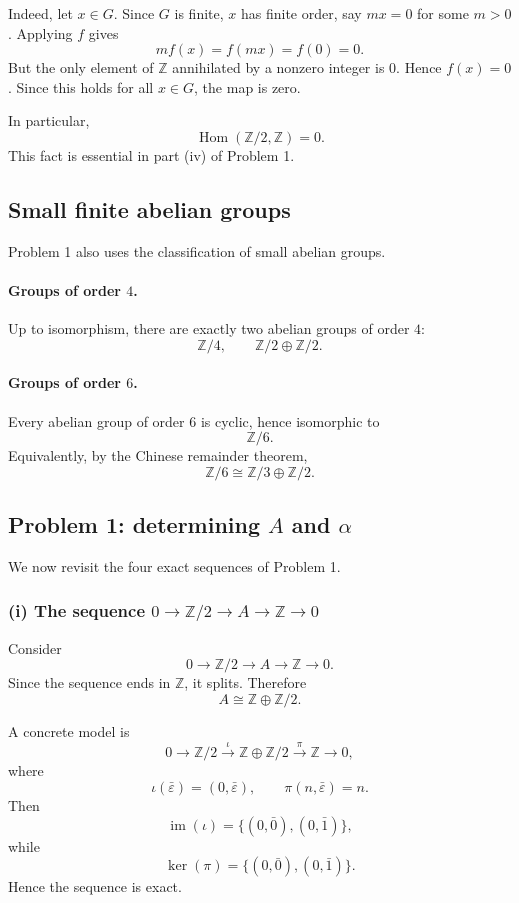 \documentclass[12pt,a4paper]{article}
\theoremstyle{notespace}
\begin{document}
Indeed, let \(x\in G\). Since \(G\) is finite, \(x\) has finite order, say \(mx=0\) for some \(m>0\). Applying \(f\) gives
\[
m f(x)=f(mx)=f(0)=0.
\]
But the only element of \(\mathbb Z\) annihilated by a nonzero integer is \(0\). Hence \(f(x)=0\). Since this holds for all \(x\in G\), the map is zero.

In particular,
\[
\operatorname{Hom}(\mathbb Z/2,\mathbb Z)=0.
\]
This fact is essential in part (iv) of Problem 1.

\subsection{Small finite abelian groups}

Problem 1 also uses the classification of small abelian groups.

\paragraph{Groups of order \(4\).}
Up to isomorphism, there are exactly two abelian groups of order \(4\):
\[
\mathbb Z/4,
\qquad
\mathbb Z/2\oplus \mathbb Z/2.
\]

\paragraph{Groups of order \(6\).}
Every abelian group of order \(6\) is cyclic, hence isomorphic to
\[
\mathbb Z/6.
\]
Equivalently, by the Chinese remainder theorem,
\[
\mathbb Z/6\cong \mathbb Z/3\oplus \mathbb Z/2.
\]

\subsection{Problem 1: determining \(A\) and \(\alpha\)}

We now revisit the four exact sequences of Problem 1.

\subsubsection*{(i) The sequence \(0\to \mathbb Z/2\to A\to \mathbb Z\to 0\)}

Consider
\[
0\longrightarrow \mathbb Z/2 \longrightarrow A \longrightarrow \mathbb Z \longrightarrow 0.
\]
Since the sequence ends in \(\mathbb Z\), it splits. Therefore
\[
A\cong \mathbb Z\oplus \mathbb Z/2.
\]

A concrete model is
\[
0\longrightarrow \mathbb Z/2
\xrightarrow{\ \iota\ }
\mathbb Z\oplus \mathbb Z/2
\xrightarrow{\ \pi\ }
\mathbb Z
\longrightarrow 0,
\]
where
\[
\iota(\bar\varepsilon)=(0,\bar\varepsilon),
\qquad
\pi(n,\bar\varepsilon)=n.
\]
Then
\[
\operatorname{im}(\iota)=\{(0,\bar 0),(0,\bar 1)\},
\]
while
\[
\ker(\pi)=\{(0,\bar 0),(0,\bar 1)\}.
\]
Hence the sequence is exact.
\end{document}
